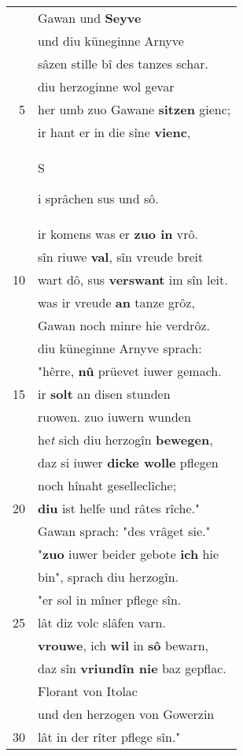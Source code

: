 \documentclass[8pt,a4paper,notitlepage]{article}
\begin{document}
\begin{table}[ht]
\begin{minipage}[t]{0.5\linewidth}
\begin{tabular}{rl}
 & Gawan und \textbf{Seyve}\\ 
 & und diu küneginne Arnyve\\ 
 & sâzen stille bî des tanzes schar.\\ 
 & diu herzoginne wol gevar\\ 
5 & her umb zuo Gawane \textbf{sitzen} gienc;\\ 
 & ir hant er in die sîne \textbf{vienc},\\ 
 & \begin{large}S\end{large}i sprâchen sus und sô.\\ 
 & ir komens was er \textbf{zuo in} vrô.\\ 
 & sîn riuwe \textbf{val}, sîn vreude breit\\ 
10 & wart dô, sus \textbf{verswant} im sîn leit.\\ 
 & was ir vreude \textbf{an} tanze grôz,\\ 
 & Gawan noch minre hie verdrôz.\\ 
 & diu küneginne Arnyve sprach:\\ 
 & "hêrre, \textbf{nû} prüevet iuwer gemach.\\ 
15 & ir \textbf{solt} an disen stunden\\ 
 & ruowen. zuo iuwern wunden\\ 
 & he\textit{t} sich diu herzogîn \textbf{bewegen},\\ 
 & daz si iuwer \textbf{dicke wolle} pflegen\\ 
 & noch hînaht geselleclîche;\\ 
20 & \textbf{diu} ist helfe und râtes rîche."\\ 
 & Gawan sprach: "des vrâget sie."\\ 
 & "\textbf{zuo} iuwer beider gebote \textbf{ich} hie\\ 
 & bin", sprach diu herzogîn.\\ 
 & "er sol in mîner pflege sîn.\\ 
25 & lât diz volc slâfen varn.\\ 
 & \textbf{vrouwe}, ich \textbf{wil} in \textbf{sô} bewarn,\\ 
 & daz sîn \textbf{vriundîn nie} baz gepflac.\\ 
 & Florant von Itolac\\ 
 & und den herzogen von Gowerzin\\ 
30 & lât in der rîter pflege sîn."\\ 
\end{tabular}
\scriptsize

\end{minipage}
\end{table}
\end{document}
